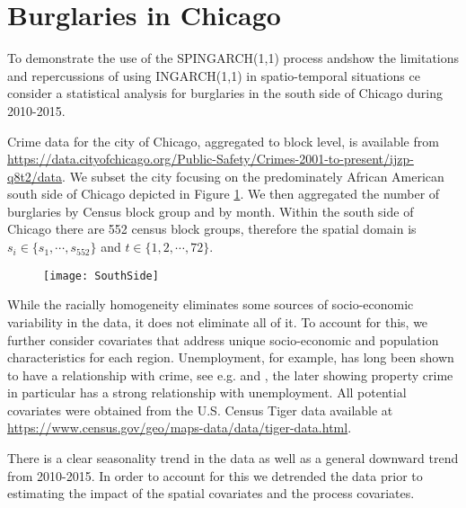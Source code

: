 \documentclass[11pt]{isuthesis}
\begin{document}
\section{Burglaries in Chicago}
To demonstrate the use of the SPINGARCH(1,1) process andshow the limitations and repercussions of using INGARCH(1,1) in spatio-temporal situations ce consider a statistical analysis for burglaries in the south side of Chicago during 2010-2015.  

Crime data for the city of Chicago, aggregated to block level, is available from \newline \href{https://data.cityofchicago.org/Public-Safety/Crimes-2001-to-present/ijzp-q8t2/data}{https://data.cityofchicago.org/Public-Safety/Crimes-2001-to-present/ijzp-q8t2/data}. We    subset the city focusing on the predominately African American south side of Chicago depicted in Figure \ref{fig:SouthSide}.  We then aggregated the number of burglaries by Census block group and by month.  Within the south side of Chicago there are 552 census block groups, therefore the spatial domain is $s_i \in \{s_1,\cdots,s_{552}\}$ and $t \in \{1,2,\cdots,72\}$.


\begin{figure}[!htp]
	\centering
	\texttt{[image: SouthSide]}
	\label{fig:SouthSide}
\end{figure}


While the racially homogeneity eliminates some sources of socio-economic variability in the data, it does not eliminate all of it.  To account for this, we further consider covariates that address unique socio-economic and population characteristics for each region. Unemployment, for example, has long been shown to have a relationship with crime, see e.g. \cite{britt1994crime} and \cite{raphael2001identifying}, the later showing property crime in particular has a strong relationship with unemployment.  All potential covariates were obtained from the U.S. Census Tiger data available at \href{https://www.census.gov/geo/maps-data/data/tiger-data.html}{https://www.census.gov/geo/maps-data/data/tiger-data.html}.

There is a clear seasonality trend in the data as well as a general downward trend from 2010-2015.  In order to account for this we detrended the data prior to estimating the impact of the spatial covariates and the process covariates.
\end{document}
